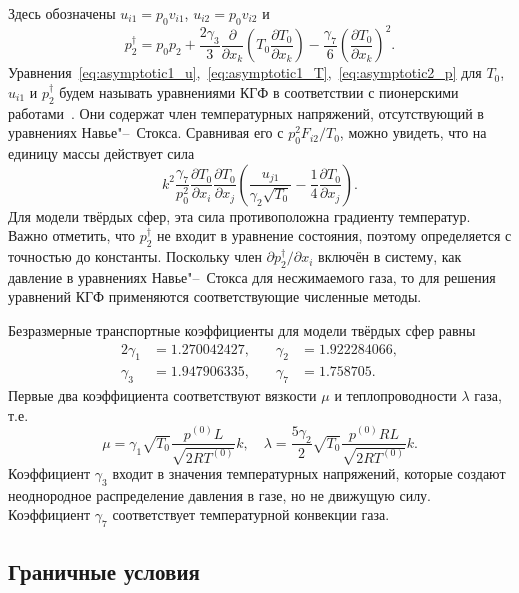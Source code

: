 \documentclass[
aps,%
12pt,%
final,%
notitlepage,%
oneside,%
onecolumn,%
nobibnotes,%
nofootinbib,%
superscriptaddress,%
noshowpacs,%
centertags]%
{revtex4}
\newcommand{\pder}[2][]{\frac{\partial#1}{\partial#2}}
\begin{document}
Здесь обозначены \(u_{i1} = p_0v_{i1}\), \(u_{i2} = p_0v_{i2}\) и
\begin{equation}\label{eq:dag_pressure}
    p_2^\dag = p_0 p_2
        + \frac{2\gamma_3}{3}\pder{x_k}\left(T_0\pder[T_0]{x_k}\right)
        - \frac{\gamma_7}{6}\left(\pder[T_0]{x_k}\right)^2.
\end{equation}
Уравнения~\eqref{eq:asymptotic1_u},~\eqref{eq:asymptotic1_T},~\eqref{eq:asymptotic2_p}
для \(T_0\), \(u_{i1}\) и \(p_2^\dag\) будем называть уравнениями КГФ
в соответствии с пионерскими работами~\cite{Kogan1992, Bobylev1995}.
Они содержат член температурных напряжений, отсутствующий в уравнениях Навье"--~Стокса.
Сравнивая его с \(p_0^2F_{i2}/T_0\), можно увидеть, что на единицу массы действует сила
\begin{equation}\label{eq:gamma7_force}
    k^2\frac{\gamma_7}{p_0^2}\pder[T_0]{x_i}\pder[T_0]{x_j}\left(\frac{u_{j1}}{\gamma_2\sqrt{T_0}} - \frac{1}4\pder[T_0]{x_j}\right).
\end{equation}
Для модели твёрдых сфер, эта сила противоположна градиенту температур.
Важно отметить, что \(p_2^\dag\) не входит в уравнение состояния,
поэтому определяется с точностью до константы.
Поскольку член \(\partial{p_2^\dag}/\partial{x_i}\) включён в систему,
как давление в уравнениях Навье"--~Стокса для несжимаемого газа,
то для решения уравнений КГФ применяются соответствующие численные методы.

Безразмерные транспортные коэффициенты для модели твёрдых сфер равны
\begin{alignat*}{2}\label{eq:gamma_coeffs}
    \gamma_1 &= 1.270042427, &\quad \gamma_2 &= 1.922284066, \\
    \gamma_3 &= 1.947906335, &\quad \gamma_7 &= 1.758705.
\end{alignat*}
Первые два коэффициента соответствуют вязкости \(\mu\) и теплопроводности \(\lambda\) газа, т.е.
\begin{equation}\label{eq:mu_lambda}
    \mu = \gamma_1\sqrt{T_0} \frac{p^{(0)}L}{\sqrt{2RT^{(0)}}} k, \quad
    \lambda = \frac{5\gamma_2}{2}\sqrt{T_0} \frac{p^{(0)}RL}{\sqrt{2RT^{(0)}}} k.
\end{equation}
Коэффициент \(\gamma_3\) входит в значения температурных напряжений,
которые создают неоднородное распределение давления в газе,
но не движущую силу. Коэффициент \(\gamma_7\) соответствует
температурной конвекции газа.

\subsection{Граничные условия}
\end{document}
